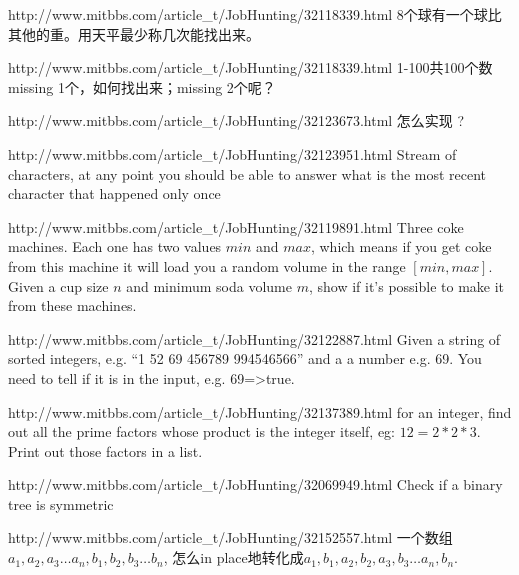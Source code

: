 \documentclass[a4paper]{article}
\newcommand{\ilcode}[1]{
	\framebox[\width]{\texttt{#1}}
}
\begin{document}
\begin{CJK}{UTF8}{gbsn}
\begin{enumerate}
\begin{Q}[Bloomberg]{http://www.mitbbs.com/article_t/JobHunting/32118339.html}
8个球有一个球比其他的重。用天平最少称几次能找出来。
\end{Q}

\begin{Q}[Bloomberg]{http://www.mitbbs.com/article_t/JobHunting/32118339.html}
1-100共100个数missing 1个，如何找出来；missing 2个呢？
\end{Q}

\begin{Q}[Amazon]{http://www.mitbbs.com/article_t/JobHunting/32123673.html}
怎么实现\ilcode{boolean isBST(Node *root)}? 
\end{Q}

\begin{Q}[Amazon]{http://www.mitbbs.com/article_t/JobHunting/32123951.html}
Stream of characters, at any point you should be able to answer what is the most recent character that happened only once
\end{Q}

\begin{Q}[Google]{http://www.mitbbs.com/article_t/JobHunting/32119891.html}
Three coke machines. Each one has two values $min$ and $max$, which means if you get coke from this machine it will load you a random volume in the range $[min, max]$. Given a cup size $n$ and minimum soda volume $m$, show if it's possible to make it from these machines.
\end{Q}

\begin{Q}[Google]{http://www.mitbbs.com/article_t/JobHunting/32122887.html}
Given a string of sorted integers, e.g. ``1 52 69 456789 994546566'' and a  a number e.g. 69. You need to tell if it is in the input, e.g. 69=>true.
\end{Q}

\begin{Q}[Amazon]{http://www.mitbbs.com/article_t/JobHunting/32137389.html}
for an integer, find out all the prime factors whose product is the integer itself, eg: $12 = 2*2*3$. Print out those factors in a list.
\end{Q}

\begin{Q}[Amazon]{http://www.mitbbs.com/article_t/JobHunting/32069949.html}
Check if a binary tree is symmetric
\end{Q}

\begin{Q}[Google]{http://www.mitbbs.com/article_t/JobHunting/32152557.html}
一个数组$a_1,a_2,a_3\ldots a_n,b_1,b_2,b_3\ldots b_n$, 怎么in place地转化成$a_1,b_1,a_2,b_2,a_3,b_3 \ldots a_n,b_n$.
\end{Q}


\end{enumerate}
\end{CJK}
\end{document}
